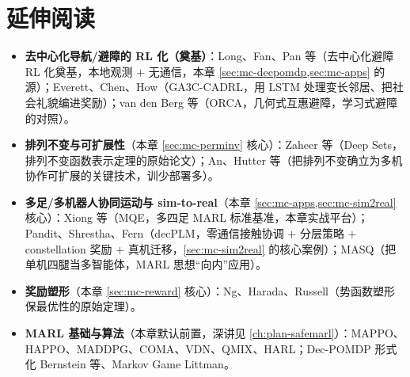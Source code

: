 \section*{延伸阅读}
\begin{itemize}
  \item \textbf{去中心化导航/避障的 RL 化（奠基）}：Long、Fan、Pan 等\cite{long2018collision}（去中心化避障 RL 化奠基，本地观测 $+$ 无通信，本章 \cref{sec:mc-decpomdp,sec:mc-apps} 的源）；Everett、Chen、How\cite{everett2018cadrl}（GA3C-CADRL，用 LSTM 处理变长邻居、把社会礼貌编进奖励）；van den Berg 等\cite{vandenberg2011orca}（ORCA，几何式互惠避障，学习式避障的对照）。
  \item \textbf{排列不变与可扩展性}（本章 \cref{sec:mc-perminv} 核心）：Zaheer 等\cite{zaheer2017deepsets}（Deep Sets，排列不变函数表示定理的原始论文）；An、Hutter 等\cite{an2024perminv}（把排列不变确立为多机协作可扩展的关键技术，训少部署多）。
  \item \textbf{多足/多机器人协同运动与 sim-to-real}（本章 \cref{sec:mc-apps,sec:mc-sim2real} 核心）：Xiong 等\cite{xiong2024mqe}（MQE，多四足 MARL 标准基准，本章实战平台）；Pandit、Shrestha、Fern\cite{pandit2025decplm}（decPLM，零通信接触协调 $+$ 分层策略 $+$ constellation 奖励 $+$ 真机迁移，\cref{sec:mc-sim2real} 的核心案例）；MASQ\cite{masq2024}（把单机四腿当多智能体，MARL 思想“向内”应用）。
  \item \textbf{奖励塑形}（本章 \cref{sec:mc-reward} 核心）：Ng、Harada、Russell\cite{ng1999shaping}（势函数塑形保最优性的原始定理）。
  \item \textbf{MARL 基础与算法}（本章默认前置，深讲见 \cref{ch:plan-safemarl}）：MAPPO\cite{yu2022mappo}、HAPPO\cite{kuba2022happo}、MADDPG\cite{lowe2017maddpg}、COMA\cite{foerster2018coma}、VDN\cite{sunehag2018vdn}、QMIX\cite{rashid2018qmix}、HARL\cite{zhong2024harl}；Dec-POMDP 形式化 Bernstein 等\cite{bernstein2002decpomdp}、Markov Game Littman\cite{littman1994markov}。
\end{itemize}

